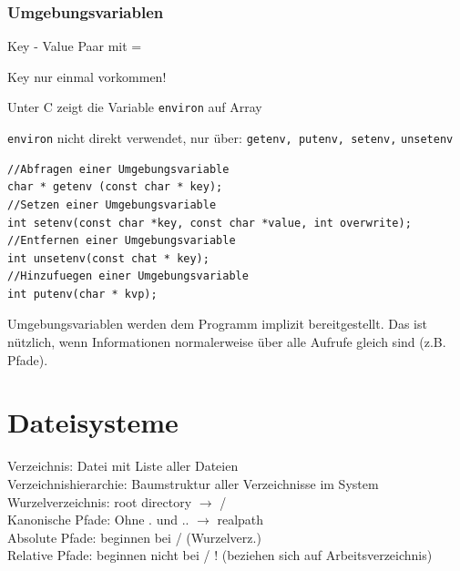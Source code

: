 \begin{multicols*}{5}
        \subsubsection{Umgebungsvariablen}
            \begin{compactitem}[$\bullet$]
                \item Key - Value Paar mit =
                \item Key nur einmal vorkommen!
                \item Unter C zeigt die Variable \texttt{environ} auf Array
                \item \texttt{environ} nicht direkt verwendet, nur über: \texttt{getenv, putenv, setenv,} \texttt{unsetenv}
            \end{compactitem}        
			
			\vspace{-6pt}
            \begin{lstlisting}
//Abfragen einer Umgebungsvariable
char * getenv (const char * key);
//Setzen einer Umgebungsvariable                
int setenv(const char *key, const char *value, int overwrite);
//Entfernen einer Umgebungsvariable                
int unsetenv(const chat * key);
//Hinzufuegen einer Umgebungsvariable
int putenv(char * kvp);
			\end{lstlisting}
			\vspace{-6pt
			}
		Umgebungsvariablen werden dem Programm implizit bereitgestellt. Das ist nützlich, wenn Informationen normalerweise über alle Aufrufe gleich sind (z.B. Pfade).\\
	
		\vspace{-10pt}

\section{Dateisysteme}
	\textcolor{h}{Verzeichnis:} Datei mit Liste aller Dateien\\
    \textcolor{h}{Verzeichnishierarchie:} Baumstruktur aller Verzeichnisse im System\\
    \textcolor{h}{Wurzelverzeichnis:} root directory $\rightarrow$ /\\
    \textcolor{h}{Kanonische Pfade:} Ohne . und .. $\rightarrow$ realpath\\
    \textcolor{h}{Absolute Pfade:} beginnen bei / (Wurzelverz.)\\
    \textcolor{h}{Relative Pfade:} beginnen nicht bei / ! (beziehen sich auf Arbeitsverzeichnis)


\end{multicols*}
